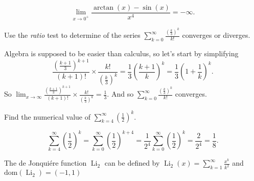 \documentclass[12pt,fleqn]{exam}
\begin{document}
\begin{questions}
\begin{parts}
\begin{solution}
\begin{equation*}
\lim_{x \to 0^{+}} \frac{\arctan(x) - \sin(x)}{x^4} = -\infty.
\end{equation*}
\end{solution}
\end{parts}
\question [1] Use the \emph{ratio} test to determine of the series $\sum_{k=0}^\infty \frac{  \left(\frac{k}{3} \right)^k }{ k!}$ converges or diverges.
\begin{solution}%
Algebra is supposed to be easier than calculus, so let's start by simplifying
\begin{equation*}
\frac{ (\frac{k+1}{3})^{k+1}}{(k+1)!} \times \frac{k!}{ \left(\frac{k}{3} \right)^k} = 
\frac{1}{3} (\frac{k+1}{k})^k = \frac{1}{3}  \left(1 + \frac{1}{k} \right)^k.
\end{equation*}
So $\displaystyle  \lim_{x \to \infty} \frac{ (\frac{k+1}{3})^{k+1}}{(k+1)!} \times \frac{k!}{ (\frac{k}{3})^k} = \frac{1}{3}$.
And so $\displaystyle \sum_{k=0}^\infty \frac{  \left(\frac{k}{3} \right)^k }{ k!}$ converges. 
\end{solution}



\question [5] Find the numerical value of  \(\displaystyle \sum_{k=4}^\infty \left(\frac{1}{2} \right)^k \).
\begin{solution}%
\[
 \sum_{k=4}^\infty \left(\frac{1}{2} \right)^k = \sum_{k=0}^\infty \left(\frac{1}{2} \right)^{k + 4}
  = \frac{1}{2^4} \sum_{k=0}^\infty \left(\frac{1}{2} \right)^{k} = \frac{2}{2^4} = \frac{1}{8}.
\]
\end{solution}


\question The de Jonqui\'ere function \(\operatorname{Li}_2\) can be defined by 
\(\displaystyle
  \operatorname{Li}_2(x) = \sum_{k=1}^\infty \frac{x^k}{k^2}
\) and $\mathrm{dom}(\operatorname{Li}_2) = (-1,1)$

\end{questions}
\end{document}
